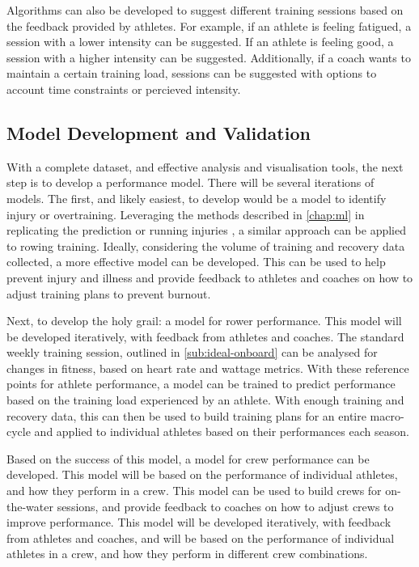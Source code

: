 Algorithms can also be developed to suggest different training sessions based on the feedback provided by athletes. For example, if an athlete is feeling fatigued, a session with a lower intensity can be suggested. If an athlete is feeling good, a session with a higher intensity can be suggested. Additionally, if a coach wants to maintain a certain training load, sessions can be suggested with options to account time constraints or percieved intensity.

\subsection{Model Development and Validation}
With a complete dataset, and effective analysis and visualisation tools, the next step is to develop a performance model. There will be several iterations of models. The first, and likely easiest, to develop would be a model to identify injury or overtraining. Leveraging the methods described in \autoref{chap:ml} in replicating the prediction or running injuries \cite{Lovdal2021}, a similar approach can be applied to rowing training. Ideally, considering the volume of training and recovery data collected, a more effective model can be developed. This can be used to help prevent injury and illness and provide feedback to athletes and coaches on how to adjust training plans to prevent burnout.

Next, to develop the holy grail: a model for rower performance. This model will be developed iteratively, with feedback from athletes and coaches. The standard weekly training session, outlined in \autoref{sub:ideal-onboard} can be analysed for changes in fitness, based on heart rate and wattage metrics. With these reference points for athlete performance, a model can be trained to predict performance based on the training load experienced by an athlete. With enough training and recovery data, this can then be used to build training plans for an entire macro-cycle and applied to individual athletes based on their performances each season. 

Based on the success of this model, a model for crew performance can be developed. This model will be based on the performance of individual athletes, and how they perform in a crew. This model can be used to build crews for on-the-water sessions, and provide feedback to coaches on how to adjust crews to improve performance. This model will be developed iteratively, with feedback from athletes and coaches, and will be based on the performance of individual athletes in a crew, and how they perform in different crew combinations.

